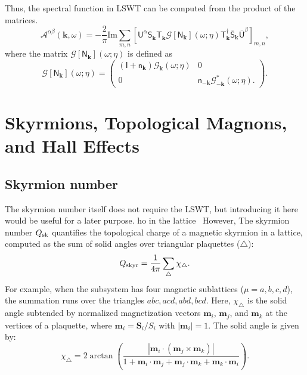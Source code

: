 \documentclass[aps, prx, nofootinbib, superscriptaddress]{revtex4-2}
\newcommand{\kvec}{\mathbf{k}}
\begin{document}
Thus, the spectral function in LSWT can be computed from the product of the matrices.
\begin{equation}
    \mathcal{A}^{\alpha\beta}(\kvec, \omega) 
    = - \frac{2}{\pi} \mathrm{Im} 
    \sum_{m,n}
    \left[ 
    \mathsf{U}^{\alpha} \mathsf{S}_{\kvec}^{\phantom \dagger} \mathsf{T}_{\kvec}^{\phantom \dagger}
    \mathcal{G} [ \mathsf{N}_{\kvec} ] (\omega ; \eta)
    \mathsf{T}^{\dagger}_{\kvec} \bar{\mathsf{S}}_{\kvec}^{\phantom \dagger} \bar{\mathsf{U}}^{\beta}
    \right]_{m,n},
\end{equation}
where the matrix $\mathcal{G} [ \mathsf{N}_{\kvec} ] (\omega ; \eta)$ is defined as 
\begin{equation}
    \mathcal{G} [ \mathsf{N}_{\kvec} ] (\omega ; \eta)
    = 
    \begin{pmatrix}
        (\mathsf{I} + \mathsf{n}_{\kvec}) \mathcal{G}_{\kvec} (\omega; \eta) & 0 \\
        0 & \mathsf{n}_{-\kvec} \mathcal{G}_{-\kvec}^{*} (\omega; \eta).
    \end{pmatrix}.
\end{equation}





\newpage
\section{Skyrmions, Topological Magnons, and Hall Effects}

\subsection{Skyrmion number}\label{subsec: Skyrmion number}

The skyrmion number itself does not require the LSWT, but introducing it here would be useful for a later purpose. 
ho in the lattice~\cite{BERG1981412} 
However,
The skyrmion number $Q_{\rm sk}$ quantifies the topological charge of a magnetic skyrmion in a lattice, computed as the sum of solid angles over triangular plaquettes ($\triangle$):
\begin{equation}
    Q_{\rm skyr} 
    = \frac{1}{4\pi} \sum_{\triangle} \chi_{\triangle}.
\end{equation}
For example, when the subsystem has four magnetic sublattices ($\mu = a, b, c, d$), the summation runs over the triangles $abc, acd, abd, bcd$.
Here, $\chi_{\triangle}$ is the solid angle subtended by normalized magnetization vectors $\mathbf{m}_i$, $\mathbf{m}_j$, and $\mathbf{m}_k$ at the vertices of a plaquette, where $\mathbf{m}_i = \mathbf{S}_i / S_i$ with $|\mathbf{m}_i| = 1$. The solid angle is given by:
\begin{equation}
    \chi_{\triangle} 
    = 2 \arctan 
    \left( 
    \frac{|\mathbf{m}_i \cdot (\mathbf{m}_j \times \mathbf{m}_k)|}{1 + \mathbf{m}_i \cdot \mathbf{m}_j + \mathbf{m}_j \cdot \mathbf{m}_k + \mathbf{m}_k \cdot \mathbf{m}_i} 
    \right).
\end{equation}
\end{document}
